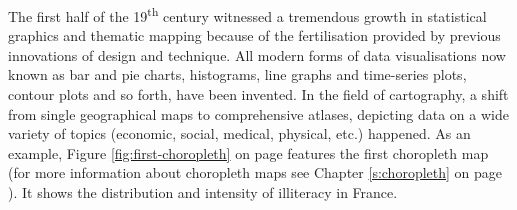 The first half of the 19\textsuperscript{th} century witnessed a tremendous growth in statistical graphics and thematic mapping because of the fertilisation provided by previous innovations of design and technique. All modern forms of data visualisations now known as bar and pie charts, histograms, line graphs and time-series plots, contour plots and so forth, have been invented. In the field of cartography, a shift from single geographical maps to comprehensive atlases, depicting data on a wide variety of topics (economic, social, medical, physical, etc.) happened. As an example, Figure \ref{fig:first-choropleth} on page \pageref{fig:first-choropleth} features the first choropleth map (for more information about choropleth maps see Chapter \ref{s:choropleth} on page \pageref{s:choropleth}). It shows the distribution and intensity of illiteracy in France.

